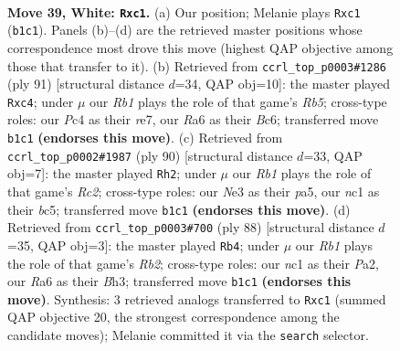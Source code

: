 \documentclass[11pt]{article}
\begin{document}
\clearpage

\begin{figure}[p]\centering
\begin{subfigure}{0.46\textwidth}\centering
\resizebox{\linewidth}{!}{%
\newchessgame
\chessboard[
  setfen={1r5k/1P4b1/R7/8/2P5/4N3/7K/1Rn5 w - - 0 39},
  showmover=false,
  pgfstyle=straightmove, color=movearrow, markmove={b1-c1}
]}
\caption{}
\end{subfigure}\hfill
\begin{subfigure}{0.46\textwidth}\centering
\resizebox{\linewidth}{!}{%
\newchessgame
\chessboard[
  setfen={8/4R3/kpb5/8/1rP5/7P/P4B2/4K3 b - - 0 46},
  showmover=false,
  pgfstyle=straightmove, color=movearrow, markmove={b4-c4}
]}
\caption{}
\end{subfigure}
\\[4pt]
\begin{subfigure}{0.46\textwidth}\centering
\resizebox{\linewidth}{!}{%
\newchessgame
\chessboard[
  setfen={8/5B2/1k5p/p1b1P3/8/8/KPR5/4r3 w - - 2 46},
  showmover=false,
  pgfstyle=straightmove, color=movearrow, markmove={c2-h2}
]}
\caption{}
\end{subfigure}\hfill
\begin{subfigure}{0.46\textwidth}\centering
\resizebox{\linewidth}{!}{%
\newchessgame
\chessboard[
  setfen={8/p5k1/6r1/8/7b/7B/PR3P2/5K2 w - - 0 45},
  showmover=false,
  pgfstyle=straightmove, color=movearrow, markmove={b2-b4}
]}
\caption{}
\end{subfigure}
\caption{\textbf{Move 39, White: \texttt{Rxc1}.} (a) Our position; Melanie plays \texttt{Rxc1} (\texttt{b1c1}). Panels (b)--(d) are the retrieved master positions whose correspondence most drove this move (highest QAP objective among those that transfer to it). (b) Retrieved from \texttt{ccrl\_top\_p0003\#1286} (ply 91) [structural distance $d$=34, QAP obj=10]: the master played \texttt{Rxc4}; under $\mu$ our \emph{Rb1} plays the role of that game's \emph{Rb5}; cross-type roles: our \emph{P}c4 as their \emph{r}e7, our \emph{R}a6 as their \emph{B}c6; transferred move \texttt{b1c1} \textbf{(endorses this move)}. (c) Retrieved from \texttt{ccrl\_top\_p0002\#1987} (ply 90) [structural distance $d$=33, QAP obj=7]: the master played \texttt{Rh2}; under $\mu$ our \emph{Rb1} plays the role of that game's \emph{Rc2}; cross-type roles: our \emph{N}e3 as their \emph{p}a5, our \emph{n}c1 as their \emph{b}c5; transferred move \texttt{b1c1} \textbf{(endorses this move)}. (d) Retrieved from \texttt{ccrl\_top\_p0003\#700} (ply 88) [structural distance $d$=35, QAP obj=3]: the master played \texttt{Rb4}; under $\mu$ our \emph{Rb1} plays the role of that game's \emph{Rb2}; cross-type roles: our \emph{n}c1 as their \emph{P}a2, our \emph{R}a6 as their \emph{B}h3; transferred move \texttt{b1c1} \textbf{(endorses this move)}. Synthesis: 3 retrieved analogs transferred to \texttt{Rxc1} (summed QAP objective 20, the strongest correspondence among the candidate moves); Melanie committed it via the \texttt{search} selector.}
\label{fig:thought-m76}
\end{figure}
\end{document}
